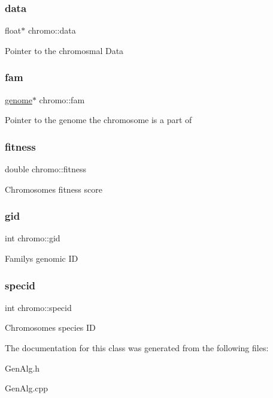 \subsubsection{\texorpdfstring{data}{data}}
{\footnotesize\ttfamily float$\ast$ chromo\+::data}

Pointer to the chromosmal Data \hypertarget{classchromo_a7242cfd29fcd1c2a49435932652ded93}{}\label{classchromo_a7242cfd29fcd1c2a49435932652ded93} 
\subsubsection{\texorpdfstring{fam}{fam}}
{\footnotesize\ttfamily \hyperlink{classgenome}{genome}$\ast$ chromo\+::fam}

Pointer to the genome the chromosome is a part of \hypertarget{classchromo_af32306a44e01d8aece6dc0a28be4af96}{}\label{classchromo_af32306a44e01d8aece6dc0a28be4af96} 
\subsubsection{\texorpdfstring{fitness}{fitness}}
{\footnotesize\ttfamily double chromo\+::fitness}

Chromosome\textquotesingle{}s fitness score \hypertarget{classchromo_a5385ce1e06960fce8931a7b243a2746c}{}\label{classchromo_a5385ce1e06960fce8931a7b243a2746c} 
\subsubsection{\texorpdfstring{gid}{gid}}
{\footnotesize\ttfamily int chromo\+::gid}

Family\textquotesingle{}s genomic ID \hypertarget{classchromo_a538577d1df21c7c7b64ea2360edbe259}{}\label{classchromo_a538577d1df21c7c7b64ea2360edbe259} 
\subsubsection{\texorpdfstring{specid}{specid}}
{\footnotesize\ttfamily int chromo\+::specid}

Chromosome\textquotesingle{}s species ID 

The documentation for this class was generated from the following files\+:\begin{DoxyCompactItemize}
\item 
Gen\+Alg.\+h\item 
Gen\+Alg.\+cpp\end{DoxyCompactItemize}

